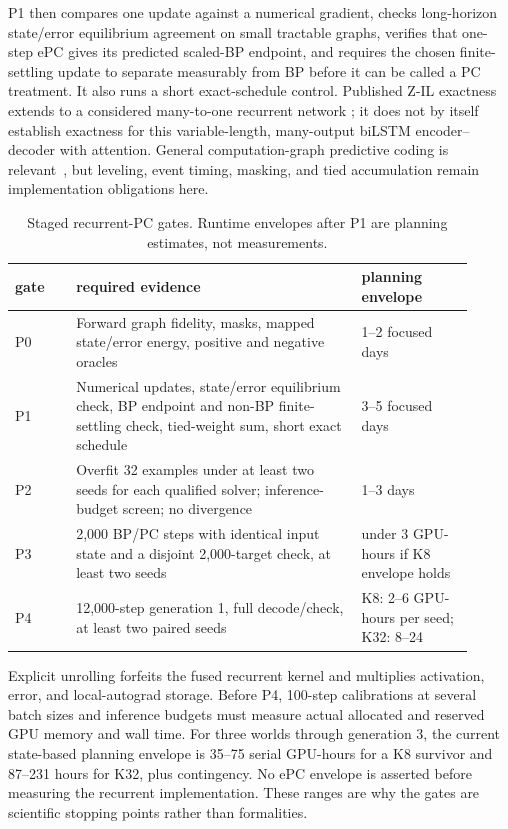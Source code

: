 \documentclass[11pt]{article}
\begin{document}
P1 then compares one update against a numerical gradient, checks long-horizon state/error
equilibrium agreement on small tractable graphs, verifies that one-step ePC gives its
predicted scaled-BP endpoint, and requires the chosen finite-settling update to separate
measurably from BP before it can be called a PC treatment.  It also runs a short
exact-schedule control.  Published Z-IL exactness extends to a considered many-to-one recurrent network
\cite{salvatori2021}; it does not by itself establish exactness for this variable-length,
many-output biLSTM encoder--decoder with attention.  General computation-graph predictive
coding is relevant~\cite{millidge2020}, but leveling, event timing, masking, and tied
accumulation remain implementation obligations here.

\begin{table}[ht]
\centering
\caption{Staged recurrent-PC gates.  Runtime envelopes after P1 are planning estimates,
not measurements.}
\label{tab:pcgates}
\begin{tabular}{@{}p{0.12\linewidth}p{0.57\linewidth}p{0.22\linewidth}@{}}
\toprule
gate & required evidence & planning envelope \\
\midrule
P0 & Forward graph fidelity, masks, mapped state/error energy, positive and negative oracles
   & 1--2 focused days \\
P1 & Numerical updates, state/error equilibrium check, BP endpoint and non-BP finite-settling
     check, tied-weight sum, short exact schedule
   & 3--5 focused days \\
P2 & Overfit 32 examples under at least two seeds for each qualified solver; inference-budget
     screen; no divergence
   & 1--3 days \\
P3 & 2,000 BP/PC steps with identical input state and a disjoint 2,000-target check,
     at least two seeds
   & under 3 GPU-hours if K8 envelope holds \\
P4 & 12,000-step generation 1, full decode/check, at least two paired seeds
   & K8: 2--6 GPU-hours per seed; K32: 8--24 \\
\bottomrule
\end{tabular}
\end{table}

Explicit unrolling forfeits the fused recurrent kernel and multiplies activation, error,
and local-autograd storage.  Before P4, 100-step calibrations at several batch sizes and
inference budgets must measure actual allocated and reserved GPU memory and wall time.
For three worlds through generation 3, the current state-based planning envelope is
35--75 serial GPU-hours for a K8 survivor and 87--231 hours for K32, plus contingency.
No ePC envelope is asserted before measuring the recurrent implementation.  These ranges
are why the gates are scientific stopping points rather than formalities.
\end{document}
